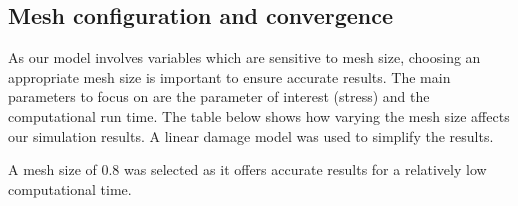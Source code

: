 \documentclass[11pt]{article}
\numberwithin{equation}{section}
\begin{document}
\subsection{Mesh configuration and convergence}
As our model involves variables which are sensitive to mesh size, choosing an appropriate mesh size is important to ensure accurate results. The main parameters to focus on are the parameter of interest (stress) and the computational run time. The table below shows how varying the mesh size affects our simulation results. A linear damage model was used to simplify the results. 
\begin{table}[H]
\end{table}
A mesh size of 0.8 was selected as it offers accurate results for a relatively low computational time. 
\end{document}
